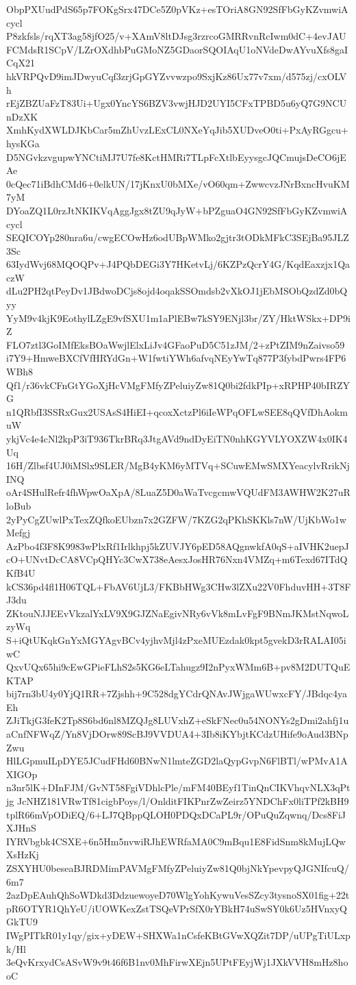 ObpPXUudPdS65p7FOKgSrx47DCe5Z0pVKz+esTOriA8GN92SfFbGyKZvmwiAcycl
P8zkfsls/rqXT3ag58jfO25/v+XAmV8ltDJsg3rzrcoGMRRvnRcIwm0dC+4evJAU
FCMdsR1SCpV/LZrOXdhbPuGMoNZ5GDaorSQOIAqU1oNVdeDwAYvuXfs8gaICqX21
hkVRPQvD9imJDwyuCqf3zrjGpGYZvvwzpo9SxjKz86Ux77v7xm/d575zj/cxOLVh
rEjZBZUaFzT83Ui+Ugx0YncYS6BZV3vwjHJD2UYI5CFxTPBD5u6yQ7G9NCUnDzXK
XmhKydXWLDJKbCar5mZhUvzLExCL0NXeYqJib5XUDveO0ti+PxAyRGgcu+hysKGa
D5NGvkzvgupwYNCtiMJ7U7fe8KctHMRi7TLpFcXtlbEyysgcJQCmujsDeCO6jEAe
0cQec71iBdhCMd6+0elkUN/17jKnxU0bMXe/vO60qm+ZwwcvzJNrBxncHvuKM7yM
DYoaZQ1L0rzJtNKIKVqAggJgx8tZU9qJyW+bPZguaO4GN92SfFbGyKZvmwiAcycl
SEQICOYp280nra6u/cwgECOwHz6odUBpWMko2gjtr3tODkMFkC3SEjBa95JLZ3Sc
63IydWvj68MQOQPv+J4PQbDEGi3Y7HKetvLj/6KZPzQcrY4G/KqdEaxzjx1QaczW
dLu2PH2qtPeyDv1JBdwoDCjs8ojd4oqakSSOmdsb2vXkOJ1jEbMSObQzdZd0bQyy
YyM9v4kjK9EothylLZgE9vfSXU1m1aPlEBw7kSY9ENjl3br/ZY/HktWSkx+DP9iZ
FLO7ztl3GoIMfEksBOaWwjlElxLiJv4GFaoPuD5C51zJM/2+zPtZIM9nZaivso59
i7Y9+HmweBXCfVfHRYdGn+W1fwtiYWh6afvqNEyYwTq877P3fybdPwrs4FP6WBh8
Qf1/r36vkCFnGtYGoXjHcVMgFMfyZPeluiyZw81Q0bi2fdkPIp+xRPHP40bIRZYG
n1QRbfI3SSRxGux2USAsS4HiEI+qcoxXctzPl6iIeWPqOFLwSEE8qQVfDhAokmuW
ykjVc4e4cNl2kpP3iT936TkrBRq3JtgAVd9ndDyEiTN0nhKGYVLYOXZW4x0IK4Uq
16H/Zlbsf4UJ0iMSlx9SLER/MgB4yKM6yMTVq+SCuwEMwSMXYeacylvRrikNjINQ
oAr4SHulRefr4fhWpwOaXpA/8LuaZ5D0aWaTvcgcmwVQUdFM3AWHW2K27uRloBub
2yPyCgZUwlPxTexZQfkoEUbzn7x2GZFW/7KZG2qPKhSKKls7nW/UjKbWo1wMefgj
AzPbo4f3F8K9983wPlxRf1Irlkhpj5kZUVJY6pED58AQgnwkfA0qS+aIVHK2uepJ
cO+UNvtDcCA8VCpQHYc3CwX738eAesxJosHR76Nxn4VMZq+m6Texd67ITdQKfB4U
kCS36pd4fl1H06TQL+FbAV6UjL3/FKBbHWg3CHw3lZXu22V0FhduvHH+3T8FJ3du
ZKtouNJJEEvVkzalYxLV9X9GJZNaEgivNRy6vVk8mLvFgF9BNmJKMstNqwoLzyWq
S+iQtUKqkGnYxMGYAgvBCv4yjhvMjl4zPxeMUEzdak0kpt5gvekD3rRALAI05iwC
QxvUQx65hi9cEwGPieFLhS2s5KG6eLTahugz9I2nPyxWMm6B+pv8M2DUTQuEKTAP
bij7rn3bU4y0YjQ1RR+7Zjshh+9C528dgYCdrQNAvJWjgaWUwxcFY/JBdqc4yaEh
ZJiTkjG3feK2Tp8S6bd6nl8MZQJg8LUVxhZ+eSkFNec0u54NONYs2gDmi2ahfj1u
aCnfNFWqZ/Yn8VjDOrw89ScBJ9VVDUA4+3Ib8iKYbjtKCdzUHife9oAud3BNpZwu
HlLGpmuILpDYE5JCudFHd60BNwN1lmteZGD2laQypGvpN6FlBTl/wPMvA1AXIGOp
n3nr5lK+DInFJM/GvNT58FgiVDhlcPle/mFM40BEyf1TinQnCIKVhqvNLX3qPtjg
JcNHZ181VRwTf81cigbPoys/l/OnlditFIKPnrZwZeirz5YNDChFx0liTPf2kBH9
tplR66mVpODiEQ/6+LJ7QBppQLOH0PDQxDCaPL9r/OPuQuZqwnq/Dcs8FiJXJHnS
IYRVbgbk4CSXE+6n5Hm5nvwiRJhEWRfaMA0C9mBqu1E8FidSnm8kMujLQwXsHzKj
ZSXYHU0beseaBJRDMimPAVMgFMfyZPeluiyZw81Q0bjNkYpevpyQJGNIfcuQ/6m7
2azDpEAuhQhSoWDkd3DdzuewoyeD70WlgYohKywuVesSZcy3tysnoSX01fig+22t
pR6OTYR1QhYeU/iUOWKexZstTSQeVPrSfX0rYBkH74uSwSY0k6Uz5HVnxyQGkTU9
IWgPITkR01y1qy/gix+yDEW+SHXWa1nCsfeKBtGVwXQZit7DP/uUPgTiULxpk/Hl
3eQvKrxydCsASvW9v9t46f6B1nv0MhFirwXEjn5UPtFEyjWj1JXkVVH8mHz8hooC
